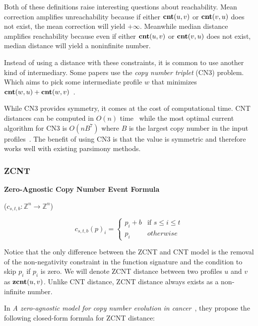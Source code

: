 \vspace{15pt}

Both of these definitions raise interesting questions about reachability. Mean correction amplifies unreachability because if either $\textbf{cnt}(u, v)$ or $\textbf{cnt}(v, u)$ does not exist, the mean correction will yield $+\infty$. Meanwhile median distance amplifies reachability because even if either $\textbf{cnt}(u, v)$ or $\textbf{cnt}(v, u)$ does not exist, median distance will yield a noninfinite number. 

Instead of using a distance with these constraints, it is common to use another kind of intermediary. Some papers use the {\it copy number triplet\/} (CN3) problem. Which aims to pick some intermediate profile $w$ that minimizes $\textbf{cnt}(w, u) + \textbf{cnt} (w, v)$~\cite{triplet_algorithm}. 

While CN3 provides symmetry, it comes at the cost of computational time. CNT distances can be computed in $O(n)$ time~\cite{linear_cnt} while the most optimal current algorithm for CN3 is $O(nB^7)$ where $B$ is the largest copy number in the input profiles~\cite{triplet_algorithm}. The benefit of using CN3 is that the value is symmetric and therefore works well with existing parsimony methods.

\subsubsection{ZCNT}

{\bf Zero-Agnostic Copy Number Event Formula} 

($c_{s, t, b}: \mathbb{Z}^n \rightarrow \mathbb{Z}^n$) 

\begin{equation}
    c_{s, t, b}{(p)}_i = \begin{cases}
        p_i + b & \text{if } s \leq i \leq t \\ 
        p_i & otherwise
    \end{cases}
\end{equation}

Notice that the only difference between the ZCNT and CNT model is the removal of the non-negativity constraint in the function signature and the condition to skip $p_i$ if $p_i$ is zero. We will denote ZCNT distance between two profiles $u$ and $v$ as $\textbf{zcnt}(u, v)$. Unlike CNT distance, ZCNT distance always exists as a non-infinite number. 

In {\it A zero-agnostic model for copy number evolution in cancer\/}~\cite{zcnt_paper}, they propose the following closed-form formula for ZCNT distance: 

